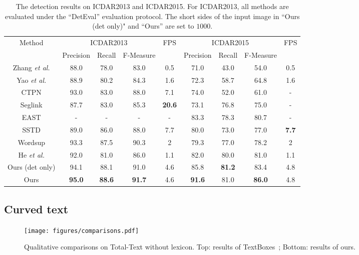 \documentclass[runningheads]{llncs}
\begin{document}
\begin{table}[ht]
\begin{centering}
\caption{The detection results on ICDAR2013 and ICDAR2015. For ICDAR2013, all methods are evaluated  under the ``DetEval” evaluation protocol. The short sides of the input image in ``Ours (det only)" and ``Ours'' are set to $1000$.}
\label{tab_detection}
\begin{tabular}{|c|c|c|c|c|c|c|c|c|}
\hline 
\multirow{2}{*}{Method} & \multicolumn{3}{c|}{ICDAR2013} & \multirow{2}{*}{FPS} & \multicolumn{3}{c|}{ICDAR2015} & \multirow{2}{*}{FPS}\tabularnewline
\cline{2-4} \cline{6-8} 
 & Precision & Recall & F-Measure &  & Precision & Recall & F-Measure & \tabularnewline
\hline 
\hline
Zhang \emph{et al.} \cite{zhang2016multi} & 88.0 & 78.0 & 83.0 & 0.5 & 71.0 & 43.0 &  54.0 & 0.5 \tabularnewline
\hline 
Yao \emph{et al.} \cite{yao2016scene} & 88.9 & 80.2 & 84.3 & 1.6 & 72.3 & 58.7 & 64.8 & 1.6  \tabularnewline
\hline 
CTPN \cite{tian2016detecting} & 93.0 & 83.0  & 88.0 & 7.1 & 74.0 & 52.0 & 61.0 & -  \tabularnewline
\hline 
Seglink \cite{shi2017detecting} & 87.7 & 83.0 & 85.3  & \textbf{20.6} & 73.1 & 76.8 & 75.0 & - \tabularnewline
\hline 
EAST \cite{zhou2017east} & - & - & - & - & 83.3 & 78.3 & 80.7 & -   \tabularnewline
\hline 
SSTD \cite{he2017single} & 89.0 & 86.0  & 88.0 & 7.7 & 80.0 & 73.0 &  77.0 & \textbf{7.7} \tabularnewline
\hline 
Wordsup \cite{hu2017wordsup} & 93.3 & 87.5 & 90.3 & 2 & 79.3 & 77.0 & 78.2 & 2  \tabularnewline
\hline 
He \emph{et al.} \cite{he2017deep} & 92.0 & 81.0 & 86.0 & 1.1 & 82.0 & 80.0 & 81.0 & 1.1 \tabularnewline
\hline 
\hline
Ours (det only) &94.1  &88.1  &91.0  &4.6   &85.8   &\textbf{81.2}  &83.4  &4.8 \tabularnewline
\hline 
Ours &\textbf{95.0}  &\textbf{88.6}  &\textbf{91.7}  &4.6   &\textbf{91.6}  &81.0  &\textbf{86.0} &4.8 \tabularnewline
\hline
\end{tabular}
\par\end{centering}
\end{table}

\subsection{Curved text}
\begin{figure}[!tp]
\begin{center}
\texttt{[image: figures/comparisons.pdf]}
\end{center}
\caption{Qualitative comparisons on Total-Text without lexicon. Top: results of TextBoxes~\cite{liao2017textboxes}; Bottom: results of ours.}
\label{fig:visu_compare}
\end{figure}
\end{document}
